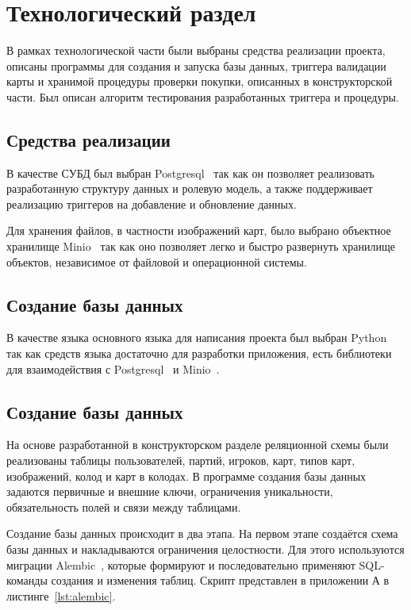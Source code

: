 \chapter{Технологический раздел}
В рамках технологической части были выбраны средства реализации проекта,
описаны программы для создания и запуска базы данных, триггера валидации карты
и
хранимой процедуры проверки покупки, описанных в конструкторской части. Был
описан алгоритм тестирования разработанных триггера и процедуры.

\section{Средства реализации}
В качестве СУБД был выбран Postgresql~\cite{postgres} так как он позволяет
реализовать разработанную структуру данных и ролевую модель, а также
поддерживает реализацию триггеров на добавление и обновление данных.

Для хранения файлов, в частности изображений карт, было выбрано объектное
хранилище Minio~\cite{minio} так как оно позволяет легко и быстро развернуть
хранилище объектов, независимое от файловой и операционной системы.

\section{Создание базы данных}

В качестве языка основного языка для написания проекта был выбран
Python~\cite{python} так как средств языка достаточно для разработки
приложения, есть библиотеки для взаимодействия с Postgresql~\cite{psycorg2} и
Minio~\cite{minio-python}.

\section{Создание базы данных}

На основе разработанной в конструкторском разделе реляционной схемы были
реализованы таблицы пользователей, партий, игроков, карт, типов карт,
изображений, колод и карт в колодах. В программе создания базы данных задаются
первичные и внешние ключи, ограничения уникальности, обязательность полей и
связи между таблицами.

Создание базы данных происходит в два этапа. На первом этапе создаётся схема
базы данных и накладываются ограничения целостности. Для этого используются
миграции Alembic~\cite{alembic}, которые формируют и последовательно применяют
SQL-команды создания и изменения таблиц. Скрипт представлен в приложении А в
листинге~\ref{lst:alembic}.

